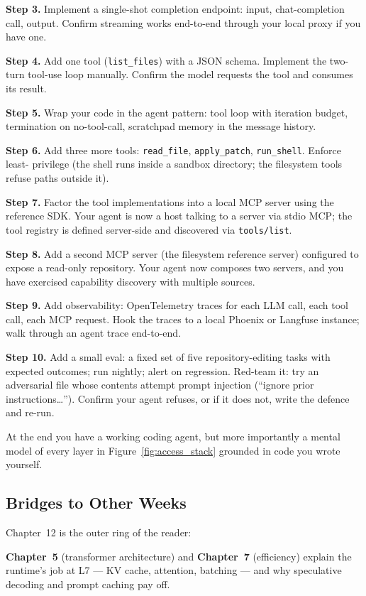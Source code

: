 \textbf{Step 3.} Implement a single-shot completion endpoint:
input, chat-completion call, output. Confirm streaming works
end-to-end through your local proxy if you have one.

\textbf{Step 4.} Add one tool (\texttt{list\_files}) with a JSON
schema. Implement the two-turn tool-use loop manually. Confirm
the model requests the tool and consumes its result.

\textbf{Step 5.} Wrap your code in the agent pattern: tool loop
with iteration budget, termination on no-tool-call, scratchpad
memory in the message history.

\textbf{Step 6.} Add three more tools: \texttt{read\_file},
\texttt{apply\_patch}, \texttt{run\_shell}. Enforce least-
privilege (the shell runs inside a sandbox directory; the
filesystem tools refuse paths outside it).

\textbf{Step 7.} Factor the tool implementations into a local
MCP server using the reference SDK. Your agent is now a host
talking to a server via stdio MCP; the tool registry is defined
server-side and discovered via \texttt{tools/list}.

\textbf{Step 8.} Add a second MCP server (the filesystem
reference server) configured to expose a read-only repository.
Your agent now composes two servers, and you have exercised
capability discovery with multiple sources.

\textbf{Step 9.} Add observability: OpenTelemetry traces for
each LLM call, each tool call, each MCP request. Hook the traces
to a local Phoenix or Langfuse instance; walk through an
agent trace end-to-end.

\textbf{Step 10.} Add a small eval: a fixed set of five
repository-editing tasks with expected outcomes; run nightly;
alert on regression. Red-team it: try an adversarial file whose
contents attempt prompt injection (``ignore prior
instructions\ldots{}''). Confirm your agent refuses, or if it
does not, write the defence and re-run.

At the end you have a working coding agent, but more importantly
a mental model of every layer in Figure~\ref{fig:access_stack}
grounded in code you wrote yourself.

\subsection{Bridges to Other Weeks}

Chapter~12 is the outer ring of the reader:

\textbf{Chapter~5} (transformer architecture) and \textbf{Chapter~7}
(efficiency) explain the runtime's job at L7 --- KV cache,
attention, batching --- and why speculative decoding and prompt
caching pay off.

